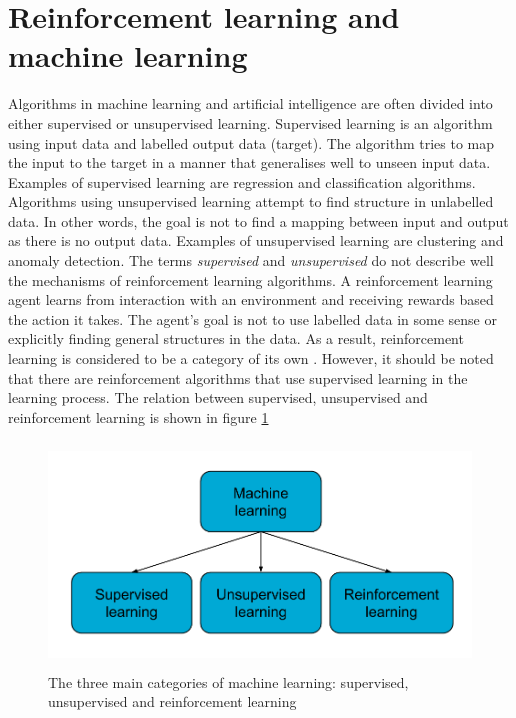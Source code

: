 \documentclass[class=book, crop=false, 11pt]{standalone}
\begin{document}
\section{Reinforcement learning and machine learning}
Algorithms in machine learning and artificial intelligence are often divided into either supervised or unsupervised learning. Supervised learning is an algorithm using input data and labelled output data (target). The algorithm tries to map the input to the target in a manner that generalises well to unseen input data. Examples of supervised learning are regression and classification algorithms. Algorithms using unsupervised learning attempt to find structure in unlabelled data. In other words, the goal is not to find a mapping between input and output as there is no output data. Examples of unsupervised learning are clustering and anomaly detection. The terms \textit{supervised} and \textit{unsupervised} do not describe well the mechanisms of reinforcement learning algorithms. A reinforcement learning agent learns from interaction with an environment and receiving rewards based the action it takes. The agent's goal is not to use labelled data in some sense or explicitly finding general structures in the data. As a result, reinforcement learning is considered to be a category of its own \cite{Sutton1998}. However, it should be noted that there are reinforcement algorithms that use supervised learning in the learning process. The relation between supervised, unsupervised and reinforcement learning is shown in figure \ref{fig:theory:supervised_vs_rl}


\begin{figure}[ht!]
    \center
    \includegraphics[height=6cm, width=12cm]{figures/supervised_vs_rl.png}
    \caption[size = 9]{The three main categories of machine learning: supervised, unsupervised and reinforcement learning}
    \label{fig:theory:supervised_vs_rl}
\end{figure}
\end{document}
